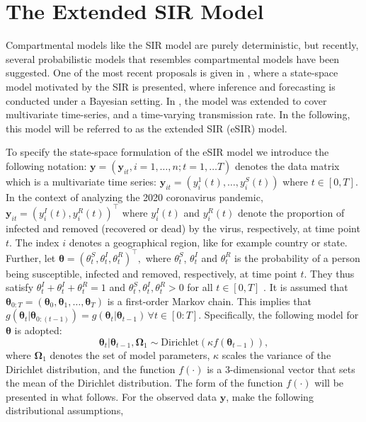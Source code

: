 \documentclass[10pt,a4paper]{article}
\begin{document}
\section{The Extended SIR Model}
Compartmental models like the SIR model are purely deterministic, but recently, several probabilistic models that resembles compartmental models have been suggested. One of the most recent proposals is given in \cite{osthus2017forecasting}, where a state-space model motivated by the SIR is presented, where inference and forecasting is conducted under a Bayesian setting. In \cite{song2020epidemiological}, the model was extended to cover multivariate time-series, and a time-varying transmission rate. In the following, this model will be referred to as the extended SIR (eSIR) model. 

To specify the state-space formulation of the eSIR model we introduce the following notation: 
%
$
\mathbf{y} = (\mathbf{y}_{it}, i = 1, \ldots, n; t = 1, \ldots T) 
$
%
denotes the data matrix which is a multivariate time series:  
%
$
\mathbf{y}_{it} = (y_{i}^1(t), \ldots, y_{i}^S(t))
$ 
%
where $t \in [0, T]$. In the context of analyzing the 2020 coronavirus pandemic, 
%
$
\mathbf{y}_{it} = (y_{i}^I(t), y_{i}^R(t))^\top
$
%
where $y_{i}^I(t)$ and $y_{i}^R(t)$ denote the proportion of infected and removed (recovered or dead) by the virus, respectively, at time point $t$. The index $i$ denotes a geographical region, like for example country or state. Further, let  
%
$
\boldsymbol{\theta} = (\theta_t^S, \theta_t^I, \theta_t^R)^\top,
$
%
where $\theta_t^S$, $\theta_t^I$ and $\theta_t^R$ is the probability of a person being susceptible, infected and removed, respectively, at time point $t$. They thus satisfy 
%
$
\theta_t^I + \theta_t^I + \theta_t^R = 1
$
% 
and 
%
$
\theta_t^S, \theta_t^I, \theta_t^R > 0
$
%
for all $t \in [0, T]$ \parencite{osthus2017forecasting}. It is assumed that 
%
$
\boldsymbol{\theta}_{0:T} = (\boldsymbol{\theta}_0, \boldsymbol{\theta}_1, \ldots, \boldsymbol{\theta}_T)
$
%
is a first-order Markov chain. This implies that 
%
$
g(\boldsymbol{\theta}_t|\boldsymbol{\theta}_{0:(t-1)}) = g(\boldsymbol{\theta}_t|\boldsymbol{\theta}_{t-1}) \, \forall t \in [0:T]. 
$
%
Specifically, the following model for $\boldsymbol{\theta}$ is adopted:
%
$$
\boldsymbol{\theta}_t | \boldsymbol{\theta}_{t-1}, \boldsymbol{\Omega}_1 \sim \text{Dirichlet}(\kappa f(\boldsymbol{\theta}_{t-1})),
$$
%
where $\boldsymbol{\Omega}_1$ denotes the set of model parameters, $\kappa$ scales the variance of the Dirichlet distribution, and the function $f(\cdot)$ is a 3-dimensional vector that sets the mean of the Dirichlet distribution. The form of the function $f(\cdot)$ will be presented in what follows. For the observed data $\mathbf{y}$, \cite{song2020epidemiological} make the following distributional assumptions,  
\end{document}
